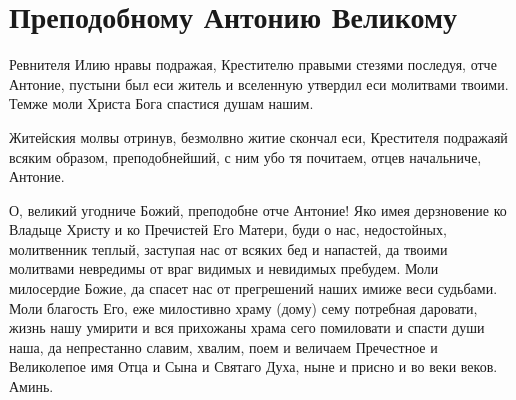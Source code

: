 \section{Преподобному Антонию Великому}\begin{mymulticols}


Ревнителя Илию нравы подражая, Крестителю правыми стезями последуя, отче Антоние, пустыни был еси житель и вселенную утвердил еси молитвами твоими. Темже моли Христа Бога спастися душам нашим.


Житейския молвы отринув, безмолвно житие скончал еси, Крестителя подражаяй всяким образом, преподобнейший, с ним убо тя почитаем, отцев начальниче, Антоние.


О, великий угодниче Божий, преподобне отче Антоние! Яко имея дерзновение ко Владыце Христу и ко Пречистей Его Матери, буди о нас, недостойных, молитвенник теплый, заступая нас от всяких бед и напастей, да твоими молитвами невредимы от враг видимых и невидимых пребудем. Моли милосердие Божие, да спасет нас от прегрешений наших имиже веси судьбами. Моли благость Его, еже милостивно храму (дому) сему потребная даровати, жизнь нашу умирити и вся прихожаны храма сего помиловати и спасти души наша, да непрестанно славим, хвалим, поем и величаем Пречестное и Великолепое имя Отца и Сына и Святаго Духа, ныне и присно и во веки веков. Аминь.

\end{mymulticols}

\mychapterending


